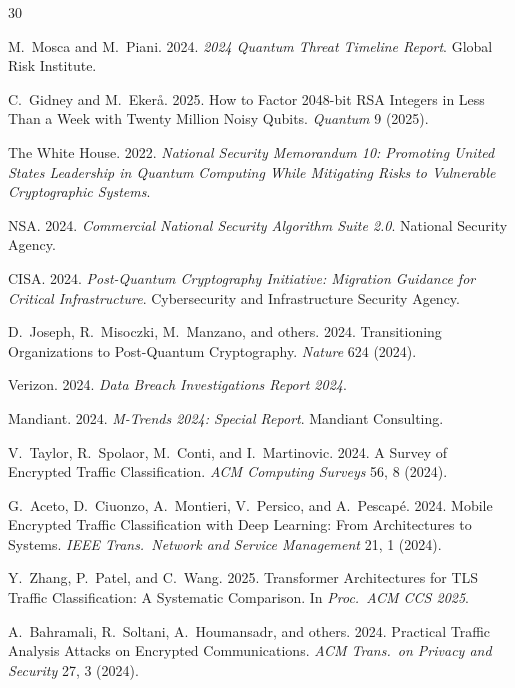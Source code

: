 \documentclass[sigconf,nonacm]{acmart}
\begin{document}
\sloppy

\begin{thebibliography}{30}

M.~Mosca and M.~Piani. 2024. \textit{2024 Quantum Threat Timeline
Report}. Global Risk Institute.

C.~Gidney and M.~Eker\aa{}. 2025. How to Factor 2048-bit RSA
Integers in Less Than a Week with Twenty Million Noisy Qubits.
\textit{Quantum} 9 (2025).

The White House. 2022. \textit{National Security Memorandum 10:
Promoting United States Leadership in Quantum Computing While
Mitigating Risks to Vulnerable Cryptographic Systems}.

NSA. 2024. \textit{Commercial National Security Algorithm Suite 2.0}.
National Security Agency.

CISA. 2024. \textit{Post-Quantum Cryptography Initiative: Migration
Guidance for Critical Infrastructure}. Cybersecurity and
Infrastructure Security Agency.

D.~Joseph, R.~Misoczki, M.~Manzano, and others. 2024. Transitioning
Organizations to Post-Quantum Cryptography. \textit{Nature} 624 (2024).

Verizon. 2024. \textit{Data Breach Investigations Report 2024}.

Mandiant. 2024. \textit{M-Trends 2024: Special Report}. Mandiant
Consulting.

V.~Taylor, R.~Spolaor, M.~Conti, and I.~Martinovic. 2024. A Survey of
Encrypted Traffic Classification. \textit{ACM Computing Surveys} 56,
8 (2024).

G.~Aceto, D.~Ciuonzo, A.~Montieri, V.~Persico, and A.~Pescap\'e. 2024.
Mobile Encrypted Traffic Classification with Deep Learning: From
Architectures to Systems. \textit{IEEE Trans.\ Network and Service
Management} 21, 1 (2024).

Y.~Zhang, P.~Patel, and C.~Wang. 2025. Transformer Architectures for
TLS Traffic Classification: A Systematic Comparison.
In \textit{Proc.\ ACM CCS 2025}.

A.~Bahramali, R.~Soltani, A.~Houmansadr, and others. 2024. Practical
Traffic Analysis Attacks on Encrypted Communications.
\textit{ACM Trans.\ on Privacy and Security} 27, 3 (2024).


\end{thebibliography}
\end{document}
